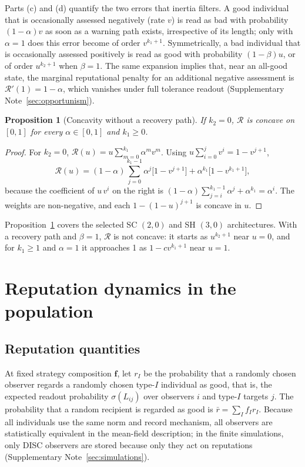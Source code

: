 \documentclass[fleqn,10pt]{article}
\theoremstyle{plain}
\newtheorem{proposition}{Proposition}
\theoremstyle{remark}
\newcommand{\Rm}{\mathcal R}
\begin{document}
Parts (c) and (d) quantify the two errors that inertia filters. A good
individual that is occasionally assessed negatively (rate $v$) is read as bad
with probability $(1-\alpha)v$ as soon as a warning path exists, irrespective of
its length; only with $\alpha=1$ does this error become of order $v^{k_1+1}$.
Symmetrically, a bad individual that is occasionally assessed positively is
read as good with probability $(1-\beta)u$, or of order $u^{k_2+1}$ when $\beta=1$.
The same expansion implies that, near an all-good state, the marginal reputational
penalty for an additional negative assessment is $\Rm'(1)=1-\alpha$, which
vanishes under full tolerance readout (Supplementary Note~\ref{sec:opportunism}).

\begin{proposition}[Concavity without a recovery path]\label{prop:concave}
If $k_2=0$, $\Rm$ is concave on $[0,1]$ for every $\alpha\in[0,1]$ and $k_1\ge0$.
\end{proposition}
\begin{proof}
For $k_2=0$, $\Rm(u)=u\sum_{m=0}^{k_1}\alpha^m v^m$. Using
$u\sum_{i=0}^{j}v^i=1-v^{j+1}$,
\[
\Rm(u)=(1-\alpha)\sum_{j=0}^{k_1-1}\alpha^j\bigl[1-v^{j+1}\bigr]+\alpha^{k_1}\bigl[1-v^{k_1+1}\bigr],
\]
because the coefficient of $u\,v^i$ on the right is
$(1-\alpha)\sum_{j=i}^{k_1-1}\alpha^j+\alpha^{k_1}=\alpha^i$. The weights are
non-negative, and each $1-(1-u)^{j+1}$ is concave in $u$.
\end{proof}
Proposition~\ref{prop:concave} covers the selected SC $(2,0)$ and SH $(3,0)$
architectures. With a recovery path and $\beta=1$, $\Rm$ is not concave: it
starts as $u^{k_2+1}$ near $u=0$, and for $k_1\ge1$ and $\alpha=1$ it approaches
1 as $1-cv^{k_1+1}$ near $u=1$.

\section{Reputation dynamics in the population}
\label{sec:population}

\subsection{Reputation quantities}
At fixed strategy composition $\boldsymbol f$, let $r_I$ be the probability that
a randomly chosen observer regards a randomly chosen type-$I$ individual as
good, that is, the expected readout probability $\sigma(L_{ij})$ over observers
$i$ and type-$I$ targets $j$. The probability that a random recipient is
regarded as good is $\bar r=\sum_If_Ir_I$. Because all individuals use the same
norm and record mechanism, all observers are statistically equivalent in the
mean-field description; in the finite simulations, only DISC observers are
stored because only they act on reputations (Supplementary
Note~\ref{sec:simulations}).
\end{document}

